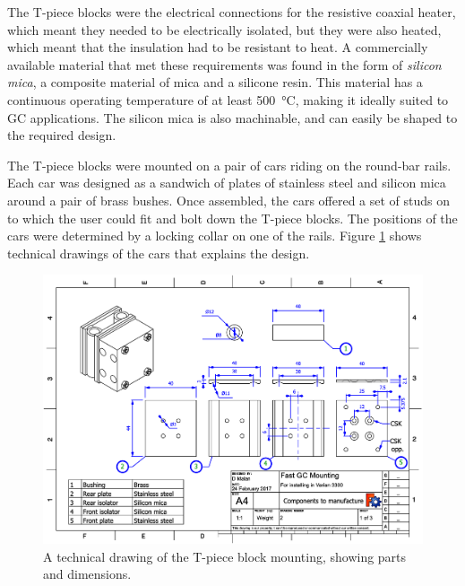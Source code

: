 The T-piece blocks were the electrical connections for the resistive coaxial
heater, which meant they needed to be electrically isolated, but they were also
heated, which meant that the insulation had to be resistant to heat. A
commercially available material that met these requirements was found in the
form of \textit{silicon mica}, a composite material of mica and a silicone
resin. This material has a continuous operating temperature of at least
\SI{500}{\celsius}, making it ideally suited to GC applications. The silicon
mica is also machinable, and can easily be shaped to the required design. 

The T-piece blocks were mounted on a pair of cars riding on the round-bar rails.
Each car was designed as a sandwich of plates of stainless steel and silicon
mica around a pair of brass bushes. Once assembled, the cars offered a set of
studs on to which the user could fit and bolt down the T-piece blocks. The
positions of the cars were determined by a locking collar on one of the rails.
Figure \ref{fig:CarsDrawing1} shows technical drawings of the cars that explains
the design.

\begin{figure}
	\centering
	\includegraphics[angle=90, origin=c, scale=0.75]{Figures/CarDrawing1.pdf}
	\decoRule	
	
	\caption[Technical drawing of coaxial heater mounting.]{A technical drawing of
	the T-piece block mounting, showing parts and dimensions.}
	
	\label{fig:CarsDrawing1}
\end{figure}

